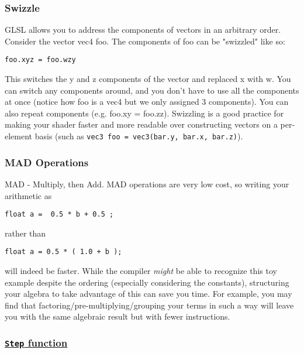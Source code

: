 \documentclass{scrartcl}
\begin{document}
\subsubsection{ Swizzle }

GLSL allows you to address the components of vectors in an arbitrary order. Consider the vector vec4 foo. The components of foo can be "swizzled" like so:

\begin{lstlisting}
foo.xyz = foo.wzy
\end{lstlisting}


This switches the y and z components of the vector and replaced x with w. You can switch any components around, and you don't have to use all the components at once (notice how foo is a vec4 but we only assigned 3 components). You can also repeat components (e.g. foo.xy = foo.zz). Swizzling is a good practice for making your shader faster and more readable over constructing vectors on a per-element basis (such as \texttt{vec3 foo = vec3(bar.y, bar.x, bar.z)}).

\subsubsection{ MAD Operations }

MAD - Multiply, then Add. MAD operations are very low cost, so writing your arithmetic as\\

\begin{lstlisting}
float a =  0.5 * b + 0.5 ;
\end{lstlisting}

rather than \\
\begin{lstlisting}
float a = 0.5 * ( 1.0 + b );
\end{lstlisting}

will indeed be faster. While the compiler \textit{might} be able to recognize this toy example despite the ordering (especially considering the constants), structuring your algebra to take advantage of this can save you time. For example, you may find that factoring/pre-multiplying/grouping your terms in such a way will leave you with the same algebraic result but with fewer instructions.

\subsubsection{ \href{https://www.opengl.org/sdk/docs/man/html/step.xhtml}{\texttt{Step} function}}
\end{document}
